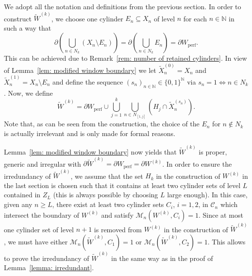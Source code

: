 \documentclass[titlepage,reqno,10pt]{amsart}
\theoremstyle{definition}
\def\N{{\mathbb N}}
\def\cC{{\mathcal C}}
\def\cM{{\mathcal M}}
\newcommand{\kl}{\left(}
\newcommand{\kr}{\right)}
\begin{document}
We adopt all the notation and definitions from the previous section.
In order to construct $\widetilde{W}^{(k)}$, we choose one cylinder $E_n\subseteq X_n$ of level $n$ for each $n\in \N$ in such a way that 
\begin{equation}\label{eq: boundary of E_n}
    \partial \kl \bigcup_{n\in N_k} (X_n\setminus E_n)\kr = \partial \kl \bigcup_{n\in N_k} E_n\kr = \partial W_{\mathrm{perf}}.
\end{equation}
This can be achieved due to Remark~\ref{rem: number of retained cylinders}. 
In view of Lemma~\ref{lem: modified window boundary} we let $\widetilde{X}_n^{(0)} = X_n$ and $\widetilde{X}_n^{(1)} = X_n \setminus E_n$ and define the sequence $(s_n)_{n\in\N} \in \{0,1\}^{\N}$ via $s_n = 1 \iff n\in N_k$.
Now, we define
$$ \widetilde{W}^{(k)}= \partial W_{\mathrm{perf}} \cup \bigcup_{j=1}^k \bigcup_{n\in N_{[1,j]}} (H_j\cap \widetilde{X}_n^{(s_n)}).$$
Note that, as can be seen from the construction, the choice of the $E_n$ for $n\notin N_k$ is actually irrelevant and is only made for formal reasons.\smallskip


Lemma~\ref{lem: modified window boundary} now yields that $\widetilde{W}^{(k)}$ is proper, generic and irregular with $\partial \widetilde{W}^{(k)} = \partial W_{\mathrm{perf}} = \partial W^{(k)}$. In order to ensure the irredundancy of $\widetilde{W}^{(k)}$, we assume that the set $H_k$ in the construction of $W^{(k)}$ in the last section is chosen such that it contains at least two cylinder sets of level $L$ contained in $Z_L$ (this is always possible by choosing $L$ large enough). In this case, given any $n\geq L$, there exist at least two cylinder sets $C_i$, $i=1,2$, in $\cC_n$ which intersect the boundary of $W^{(k)}$ and satisfy $\cM_n(W^{(k)},C_i)=1$. Since at most one cylinder set of level $n+1$ is removed from $W^{(k)}$ in the construction of $\widetilde{W}^{(k)}$, we must have either $\cM_n(\widetilde{W}^{(k)},C_1)=1$ or $\cM_n(\widetilde{W}^{(k)},C_2)=1$. This allows to prove the irredundancy of $\widetilde{W}^{(k)}$ in the same way as in the proof of Lemma~\ref{lemma: irredundant}. 
\end{document}
